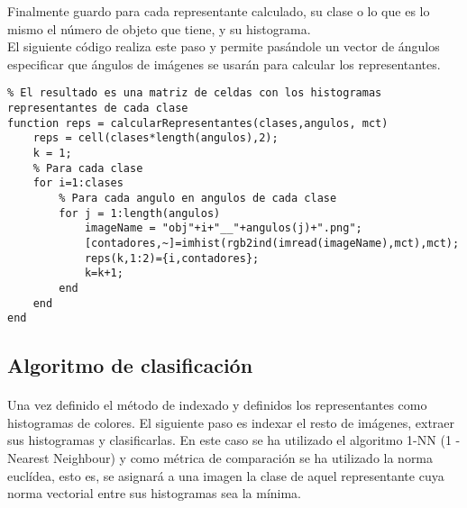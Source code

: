 \documentclass[es,gi]{ifirak}\usepackage[]{graphicx}\usepackage[]{color}
\begin{document}
Finalmente guardo para cada representante calculado, su clase o lo que es lo mismo el número de objeto que tiene, y su histograma.\\

El siguiente código realiza este paso y permite pasándole un vector de ángulos especificar que ángulos de imágenes se usarán para calcular los representantes.

\begin{lstlisting}
% El resultado es una matriz de celdas con los histogramas representantes de cada clase
function reps = calcularRepresentantes(clases,angulos, mct)
    reps = cell(clases*length(angulos),2);
    k = 1;
    % Para cada clase
    for i=1:clases
        % Para cada angulo en angulos de cada clase
        for j = 1:length(angulos)
            imageName = "obj"+i+"__"+angulos(j)+".png";
            [contadores,~]=imhist(rgb2ind(imread(imageName),mct),mct);
            reps(k,1:2)={i,contadores};
            k=k+1;
        end 
    end
end
\end{lstlisting}

\subsection{Algoritmo de clasificación}
\paragraph{} Una vez definido el método de indexado y definidos los representantes como histogramas de colores. El siguiente paso es indexar el resto de imágenes, extraer sus histogramas y clasificarlas. En este caso se ha utilizado el algoritmo 1-NN (1 - Nearest Neighbour) y como métrica de comparación se ha utilizado la norma euclídea, esto es, se asignará a una imagen la clase de aquel representante cuya norma vectorial entre sus histogramas sea la mínima.
\end{document}
